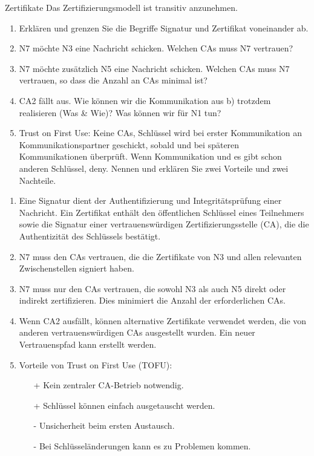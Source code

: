 \documentclass{article}
\begin{document}
\begin{exercise}{Zertifikate}
  Das Zertifizierungsmodell ist transitiv anzunehmen.

  

  \begin{enumerate}
    \item Erklären und grenzen Sie die Begriffe Signatur und Zertifikat voneinander ab.
    \item N7 möchte N3 eine Nachricht schicken. Welchen CAs muss N7 vertrauen?
    \item N7 möchte zusätzlich N5 eine Nachricht schicken. Welchen CAs muss N7 vertrauen, so dass die Anzahl an CAs minimal ist?
    \item CA2 fällt aus. Wie können wir die Kommunikation aus b) trotzdem realisieren (Was \& Wie)? Was können wir für N1 tun?
    \item Trust on First Use: Keine CAs, Schlüssel wird bei erster Kommunikation an Kommunikationspartner geschickt, sobald und bei späteren Kommunikationen überprüft. Wenn Kommunikation und es gibt schon anderen Schlüssel, deny. Nennen und erklären Sie zwei Vorteile und zwei Nachteile.
  \end{enumerate}

  \begin{solution}
    \begin{enumerate}
        \item Eine Signatur dient der Authentifizierung und Integritätsprüfung einer Nachricht. Ein Zertifikat enthält den öffentlichen Schlüssel eines Teilnehmers sowie die Signatur einer vertrauenswürdigen Zertifizierungsstelle (CA), die die Authentizität des Schlüssels bestätigt.
        \item N7 muss den CAs vertrauen, die die Zertifikate von N3 und allen relevanten Zwischenstellen signiert haben.
        \item N7 muss nur den CAs vertrauen, die sowohl N3 als auch N5 direkt oder indirekt zertifizieren. Dies minimiert die Anzahl der erforderlichen CAs.
        \item Wenn CA2 ausfällt, können alternative Zertifikate verwendet werden, die von anderen vertrauenswürdigen CAs ausgestellt wurden. Ein neuer Vertrauenspfad kann erstellt werden.
        \item Vorteile von Trust on First Use (TOFU):
          \begin{itemize}
              \item[+] Kein zentraler CA-Betrieb notwendig.
              \item[+] Schlüssel können einfach ausgetauscht werden.
              \item[-] Unsicherheit beim ersten Austausch.
              \item[-] Bei Schlüsseländerungen kann es zu Problemen kommen.
          \end{itemize}
    \end{enumerate}
  \end{solution}
\end{exercise}
\end{document}
